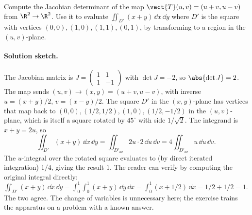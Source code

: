 \begin{exercise}
Compute the Jacobian determinant of the map $\vect{T}(u, v) = (u +
v, u - v)$ from $\R^{2} \to \R^{2}$. Use it to evaluate
$\iint_{D'} (x + y)\,\dd x\,\dd y$ where $D'$ is the square with
vertices $(0, 0), (1, 0), (1, 1), (0, 1)$, by transforming to a
region in the $(u, v)$-plane.

\paragraph{Solution sketch.} The Jacobian matrix is $J = \begin{pmatrix} 1 & 1 \\ 1 & -1 \end{pmatrix}$ with $\det J = -2$, so
$\abs{\det J} = 2$. The map sends $(u, v) \to (x, y) = (u + v,
u - v)$, with inverse $u = (x + y)/2$, $v = (x - y)/2$. The square
$D'$ in the $(x, y)$-plane has vertices that map back to
$(0, 0), (1/2, 1/2), (1, 0), (1/2, -1/2)$ in the $(u, v)$-plane,
which is itself a square rotated by $45^{\circ}$ with side
$1/\sqrt{2}$. The integrand is $x + y = 2 u$, so
\[
\iint_{D'}(x + y)\,\dd x\,\dd y = \iint_{D'_{uv}} 2 u \cdot 2\,
\dd u\,\dd v = 4 \iint_{D'_{uv}} u\,\dd u\,\dd v.
\]
The $u$-integral over the rotated square evaluates to (by direct
iterated integration) $1/4$, giving the result $1$. The reader can
verify by computing the original integral directly: $\iint_{D'}
(x + y)\,\dd x\,\dd y = \int_{0}^{1}\!\int_{0}^{1}(x + y)\,\dd y\,
\dd x = \int_{0}^{1}(x + 1/2)\,\dd x = 1/2 + 1/2 = 1$. The two
agree. The change of variables is unnecessary here; the exercise
trains the apparatus on a problem with a known answer.
\end{exercise}

